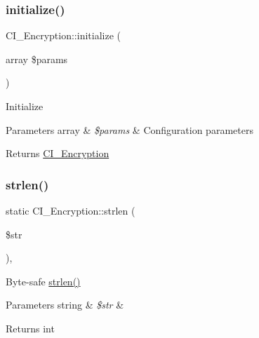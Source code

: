 \subsubsection{\texorpdfstring{initialize()}{initialize()}}
{\footnotesize\ttfamily C\+I\+\_\+\+Encryption\+::initialize (\begin{DoxyParamCaption}\item[{array}]{\$params }\end{DoxyParamCaption})}

Initialize


\begin{DoxyParams}[1]{Parameters}
array & {\em \$params} & Configuration parameters \\
\hline
\end{DoxyParams}
\begin{DoxyReturn}{Returns}
\mbox{\hyperlink{class_c_i___encryption}{C\+I\+\_\+\+Encryption}} 
\end{DoxyReturn}
\mbox{\label{class_c_i___encryption_a484b998fd27eb86c142a604199a5622f}} 
\subsubsection{\texorpdfstring{strlen()}{strlen()}}
{\footnotesize\ttfamily static C\+I\+\_\+\+Encryption\+::strlen (\begin{DoxyParamCaption}\item[{}]{\$str }\end{DoxyParamCaption})\hspace{0.3cm}{\ttfamily [static]}, {\ttfamily [protected]}}

Byte-\/safe \mbox{\hyperlink{class_c_i___encryption_a484b998fd27eb86c142a604199a5622f}{strlen()}}


\begin{DoxyParams}[1]{Parameters}
string & {\em \$str} & \\
\hline
\end{DoxyParams}
\begin{DoxyReturn}{Returns}
int 
\end{DoxyReturn}
\mbox{\label{class_c_i___encryption_afe1a0f30aec9e553b677a03cf5fa21b1}} 
